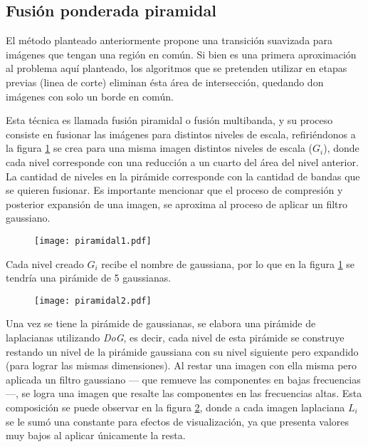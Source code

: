 \subsection{Fusión ponderada piramidal}

El método planteado anteriormente propone una transición suavizada para imágenes que tengan una región en común. Si bien es una primera aproximación al problema aquí planteado, los algoritmos que se pretenden utilizar en etapas previas (linea de corte) eliminan ésta área de intersección, quedando don imágenes con solo un borde en común. 

Esta técnica es llamada fusión piramidal o fusión multibanda, y su proceso consiste en fusionar las imágenes para distintos niveles de escala, refiriéndonos a la figura \ref{imagen:piramidal1} se crea para una misma imagen distintos niveles de escala ($G_i$), donde cada nivel corresponde con una reducción a un cuarto del área del nivel anterior. La cantidad de niveles en la pirámide corresponde con la cantidad de bandas que se quieren fusionar. Es importante mencionar que el proceso de compresión y posterior expansión de una imagen, se aproxima al proceso de aplicar un filtro gaussiano.

\begin{figure}[h]
	\centering
	\texttt{[image: piramidal1.pdf]}
	\caption[Fusión piramidal]{}
	\label{imagen:piramidal1}
\end{figure}

Cada nivel creado $G_i$ recibe el nombre de gaussiana, por lo que en la figura \ref{imagen:piramidal1} se tendría una pirámide de 5 gaussianas.

\begin{figure}[h]
	\centering
	\texttt{[image: piramidal2.pdf]}
	\caption[Fusión piramidal]{}
	\label{imagen:piramidal2}
\end{figure}

Una vez se tiene la pirámide de gaussianas, se elabora una pirámide de laplacianas utilizando \textit{DoG}, es decir, cada nivel de esta pirámide se construye restando un nivel de la pirámide gaussiana con su nivel siguiente pero expandido (para lograr las mismas dimensiones). Al restar una imagen con ella misma pero aplicada un filtro gaussiano --- que remueve las componentes en bajas frecuencias ---, se logra una imagen que resalte las componentes en las frecuencias altas. Esta composición se puede observar en la figura \ref{imagen:piramidal2}, donde a cada imagen laplaciana $L_i$ se le sumó una constante para efectos de visualización, ya que presenta valores muy bajos al aplicar únicamente la resta.

